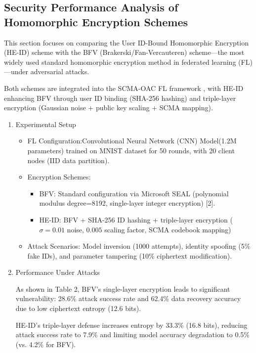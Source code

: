 \documentclass[runningheads]{llncs}
\begin{document}
\subsection{Security Performance Analysis of Homomorphic Encryption Schemes}
This section focuses on comparing the User ID-Bound Homomorphic Encryption (HE-ID) scheme with the BFV (Brakerski/Fan-Vercauteren) scheme—the most widely used standard homomorphic encryption method in federated learning (FL)—under adversarial attacks.

Both schemes are integrated into the SCMA-OAC FL framework , with HE-ID enhancing BFV through user ID binding (SHA-256 hashing) and triple-layer encryption (Gaussian noise + public key scaling + SCMA mapping).

\begin{enumerate}
\item Experimental Setup
    \begin{itemize}
        \item FL Configuration:Convolutional Neural Network (CNN) Model(1.2M parameters) trained on MNIST dataset for 50 rounds, with 20 client nodes (IID data partition).
        \item Encryption Schemes:
            \begin{itemize}
            \item BFV: Standard configuration via Microsoft SEAL (polynomial modulus degree=8192, single-layer integer encryption) [2].
            \item HE-ID: BFV + SHA-256 ID hashing + triple-layer encryption ($\sigma=0.01$ noise, $0.005$ scaling factor, SCMA codebook mapping)
            \end{itemize}
        \item Attack Scenarios: Model inversion (1000 attempts), identity spoofing (5\% fake IDs), and parameter tampering (10\% ciphertext modification).
    \end{itemize}
\item Performance Under Attacks
 
 As shown in Table 2, BFV's single-layer encryption leads to significant vulnerability: 28.6\% attack success rate and 62.4\% data recovery accuracy due to low ciphertext entropy (12.6 bits).
 
 HE-ID's triple-layer defense increases entropy by 33.3\% (16.8 bits), reducing attack success rate to 7.9\% and limiting model accuracy degradation to 0.5\% (vs. 4.2\% for BFV).
\end{enumerate}
\end{document}
